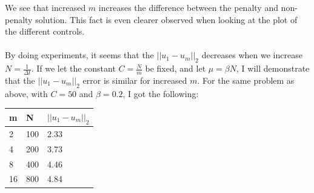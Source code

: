 \documentclass[11pt,a4paper]{article}
\begin{document}
We see that increased $m$ increases the difference between the penalty and non-penalty solution. This fact is even clearer observed when looking at the plot of the different controls.
\\
\\
By doing experiments, it seems that the  $||u_1-u_m||_2$ decreases when we increase $N=\frac{1}{\Delta t}$.  If we let the constant $C= \frac{N}{m}$ be fixed, and let $\mu=\beta N$, I will demonstrate that the $||u_1-u_m||_2$ error is similar for increased $m$. For the same problem as above, with $C=50$ and $\beta=0.2$, I got the following:
\begin{center}
    \begin{tabular}{| l | l | l |}
    \hline
    m &  N&$ ||u_1-u_m||_2$ \\ \hline
    2 & 100 &2.33\\ \hline
    4 & 200 &3.73\\ \hline
    8 & 400 &4.46\\ \hline
    16 & 800 &4.84 \\ \hline
    \end{tabular}
\end{center}
\end{document}
